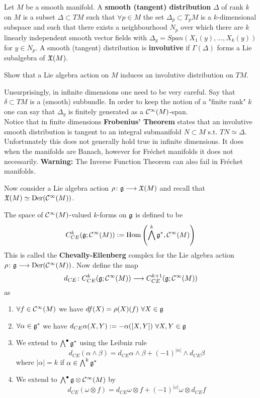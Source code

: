 \begin{definition}
  Let $M$ be a smooth manifold. A \textbf{smooth (tangent) distribution} $\Delta$ of rank $k$ on $M$ is a subset $\Delta \subset TM$ such that $\forall p \in M$ the set $\Delta_p \subset T_p M$ is a $k$-dimensional subspace and such that there exists a neighbourhood $N_p$ over which there are $k$ linearly independent smooth vector fields with $\Delta_y = Span(X_1(y), ..., X_k(y))$ for $y \in N_p$. A smooth (tangent) distribution is \textbf{involutive} if $\Gamma(\Delta)$ forms a Lie subalgebra of $\mathfrak{X}(M)$.
\end{definition}

\begin{ex}
  Show that a Lie algebra action on $M$ induces an involutive distribution on $TM$.
\end{ex}

\begin{rem}
  Unsurprisingly, in infinite dimensions one need to be very careful. Say that $\delta \subset TM$ is a (smooth) subbundle. In order to keep the notion of a "finite rank" $k$ one can say that $\Delta_y$ is finitely generated as a $\mathcal{C}^{\infty}(M)$-span.\\
  Notice that in finite dimensions \textbf{Frobenius' Theorem} states that an involutive smooth distribution is tangent to an integral submanifold $N \subset M$ s.t. $TN \simeq \Delta$. Unfortunately this does not generally hold true in infinite dimensions. It does when the manifolds are Banach, however for Fréchet manifolds it does not necessarily. \textbf{Warning:} The Inverse Function Theorem can also fail in Fréchet manifolds.
\end{rem}

Now consider a Lie algebra action $\rho \colon \mathfrak{g} \longrightarrow \mathfrak{X}(M)$ and recall that $\mathfrak{X}(M) \simeq \operatorname{Der}(\mathcal{C}^{\infty}(M))$.

\begin{definition}
  The space of $\mathcal{C}^{\infty}(M)$-valued $k$-forms on $\mathfrak{g}$ is defined to be
  $$ C^k_{CE}(\mathfrak{g} ; \mathcal{C}^{\infty}(M)) := \operatorname{Hom}\left(\bigwedge^k \mathfrak{g}^*, \mathcal{C}^{\infty}(M)\right) $$
  This is called the \textbf{Chevally-Eilenberg} complex for the Lie algebra action $\rho \colon \mathfrak{g} \longrightarrow \operatorname{Der}(\mathcal{C}^{\infty}(M))$. Now define the map
  $$ d_{CE} \colon C^k_{CE}(\mathfrak{g} ; \mathcal{C}^{\infty}(M)) \longrightarrow C^{k+1}_{CE}(\mathfrak{g} ; \mathcal{C}^{\infty}(M)) $$
  as
  \begin{enumerate}
    \item $\forall f\in \mathcal{C}^{\infty}(M)$ we have $df(X)= \rho(X)(f) \ \forall X \in \mathfrak{g}$
    \item $\forall \alpha \in \mathfrak{g}^*$ we have $d_{CE}\alpha(X,Y) := - \alpha([X,Y]) \ \forall X,Y \in \gf$
    \item We extend to $\bigwedge^\bullet \mathfrak{g}^*$ using the Leibniz rule
    $$ d_{CE} (\alpha \wedge \beta) = d_{CE}\alpha \wedge \beta + (-1)^{|\alpha|} \wedge d_{CE} \beta $$
    where $|\alpha| = k$ if $\alpha \in \bigwedge^k\mathfrak{g}^*$
    \item We extend to $\bigwedge^\bullet \mathfrak{g} \otimes \mathcal{C}^{\infty}(M)$ by
    $$ d_{CE}(\omega \otimes f) = d_{CE} \omega \otimes f + (-1)^{|\omega|} \omega \otimes d_{CE} f$$
  \end{enumerate}
\end{definition}

